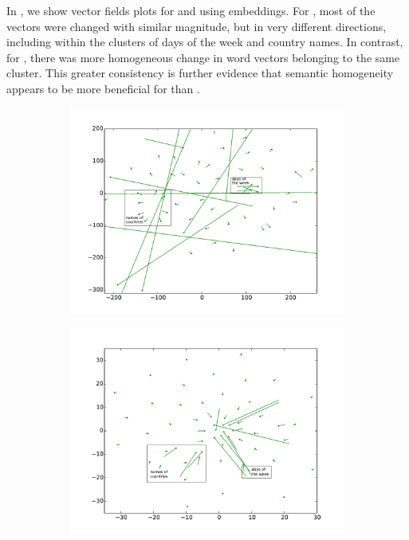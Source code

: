 In , we show vector fields plots for \chunking and \ner using \Skipgram embeddings.
For \chunking, most of the vectors were changed with similar magnitude,
but in very different directions, including within the clusters of days of
the week and country names.
In contrast, for \ner, there was more homogeneous change in word vectors
belonging to the same cluster.
This greater consistency is further evidence that semantic homogeneity
appears to be more beneficial for \ner than \chunking. 


\begin{figure}[t!]
\centering
\begin{subfigure}[b]{0.48\textwidth}
	\centering
    \includegraphics[width=\textwidth]{plots/vectorField/Lizhen/scaled/Lizhen_skip_chunking}
	\subcaption{\chunking}	
	\label{fig:skipChu}
\end{subfigure}
\begin{subfigure}[b]{0.48\textwidth}
	\centering
    \includegraphics[width=\textwidth]{plots/vectorField/Lizhen/Lizhen_skip_NER}    	

\end{subfigure}
\end{figure}
